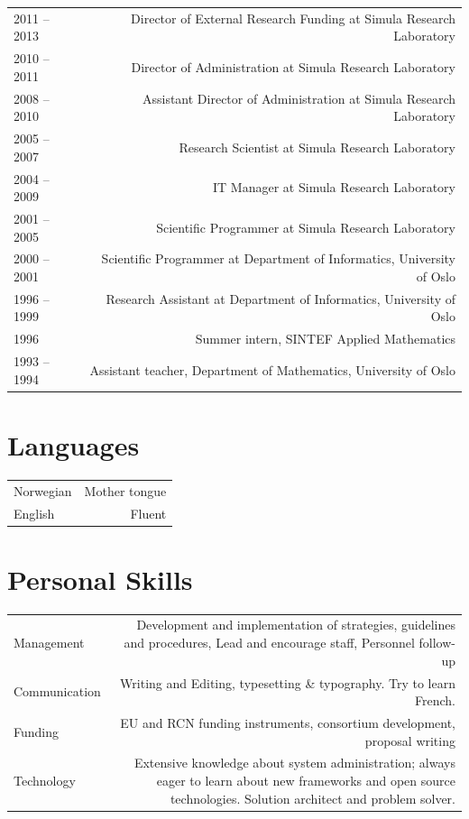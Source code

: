 \documentclass[english,a4paper,11pt]{article}
\begin{document}
\begin{tabular}{LR}
2011 -- 2013 &  Director of External Research Funding at Simula Research
   Laboratory \\
2010 -- 2011 & Director of Administration at Simula Research Laboratory \\
2008 -- 2010 & Assistant Director of Administration at Simula Research Laboratory \\
2005 -- 2007 & Research Scientist at Simula Research Laboratory \\ 
2004 -- 2009 & IT Manager at Simula Research Laboratory \\
2001 -- 2005 & Scientific Programmer at Simula Research Laboratory \\
2000 -- 2001 & Scientific Programmer at Department of Informatics, University of Oslo \\
1996 -- 1999 & Research Assistant at Department of Informatics, University of Oslo \\
1996         & Summer intern, SINTEF Applied Mathematics \\
1993 -- 1994 & Assistant teacher, Department of Mathematics, University of Oslo \\
\end{tabular}

\section*{Languages}
\begin{tabular}{LR}
Norwegian & Mother tongue \\
English & Fluent \\
\end{tabular}

\section*{Personal Skills}
\begin{tabular}{LR}
Management & Development and implementation of strategies, guidelines and
procedures, Lead and encourage staff, Personnel follow-up \\ \addlinespace
Communication & Writing and Editing, typesetting \& typography. Try to learn
French.
\\ \addlinespace
Funding & EU and RCN funding instruments, consortium development, proposal
writing \\ \addlinespace
Technology & Extensive knowledge about
system administration; always eager to learn about new frameworks and open
source technologies. Solution architect and problem solver. \\
\end{tabular}
\end{document}
